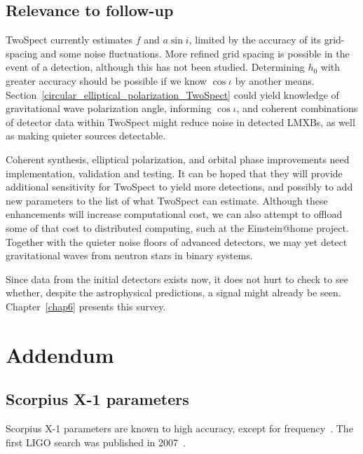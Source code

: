 \subsection{Relevance to follow-up}

TwoSpect currently estimates $f$ and $a \sin i$, limited by the accuracy of its grid-spacing and some noise fluctuations. 
More refined grid spacing is possible in the event of a detection, although this has not been studied. 
Determining $h_0$ with greater accuracy should be possible if we know $\cos \iota$ by another means.
Section~\ref{circular_elliptical_polarization_TwoSpect} could yield knowledge of gravitational wave polarization angle, informing $\cos \iota$, and coherent combinations of detector data within TwoSpect might reduce noise in detected LMXBs, as well as making quieter sources detectable. 

Coherent synthesis, elliptical polarization, and orbital phase improvements
need implementation, validation and testing.
It can be hoped that they will provide additional sensitivity for TwoSpect to yield more detections, and possibly to add new parameters to the list of what TwoSpect can estimate.
Although these enhancements will increase computational cost, we can also attempt to offload some of that cost to distributed computing, such at the Einstein@home project.
Together with the quieter noise floors of advanced detectors, we may yet detect gravitational waves from neutron stars in binary systems.

Since data from the initial detectors exists now, it does not hurt to check to see whether, despite the astrophysical predictions, a signal might already be seen.
Chapter~\ref{chap6} presents this survey.

\section{Addendum}
\label{chap5_addendum}


\subsection{Scorpius X-1 parameters}
\label{scox1_parameters}

Scorpius X-1 parameters are known to high accuracy, except for frequency~\cite{Galloway2014}.
The first LIGO search was published in 2007~\cite{AbbottScoX12007}.

